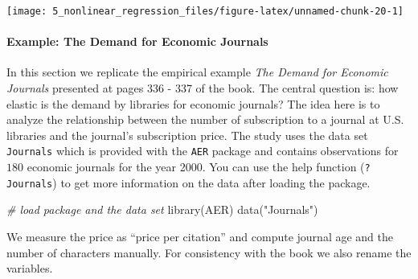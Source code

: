 \documentclass[
]{article}
\newenvironment{Shaded}{\begin{snugshade}}{\end{snugshade}}
\newcommand{\CommentTok}[1]{\textcolor[rgb]{0.56,0.35,0.01}{\textit{#1}}}
\newcommand{\DecValTok}[1]{\textcolor[rgb]{0.00,0.00,0.81}{#1}}
\newcommand{\FunctionTok}[1]{\textcolor[rgb]{0.00,0.00,0.00}{#1}}
\newcommand{\NormalTok}[1]{#1}
\newcommand{\OtherTok}[1]{\textcolor[rgb]{0.56,0.35,0.01}{#1}}
\newcommand{\SpecialCharTok}[1]{\textcolor[rgb]{0.00,0.00,0.00}{#1}}
\newcommand{\StringTok}[1]{\textcolor[rgb]{0.31,0.60,0.02}{#1}}
\begin{document}
\begin{center}\texttt{[image: 5\_nonlinear\_regression\_files/figure-latex/unnamed-chunk-20-1]} \end{center}

\hypertarget{example-the-demand-for-economic-journals}{%
\paragraph*{Example: The Demand for Economic
Journals}\label{example-the-demand-for-economic-journals}}

In this section we replicate the empirical example
\textit{The Demand for Economic Journals} presented at pages 336 - 337
of the book. The central question is: how elastic is the demand by
libraries for economic journals? The idea here is to analyze the
relationship between the number of subscription to a journal at U.S.
libraries and the journal's subscription price. The study uses the data
set \texttt{Journals} which is provided with the \texttt{AER} package
and contains observations for \(180\) economic journals for the year
2000. You can use the help function (\texttt{?Journals}) to get more
information on the data after loading the package.

\begin{Shaded}
\begin{Highlighting}[]
\CommentTok{\# load package and the data set}
\FunctionTok{library}\NormalTok{(AER)}
\FunctionTok{data}\NormalTok{(}\StringTok{"Journals"}\NormalTok{)}
\end{Highlighting}
\end{Shaded}

We measure the price as ``price per citation'' and compute journal age
and the number of characters manually. For consistency with the book we
also rename the variables.

\begin{Shaded}
\end{Shaded}
\end{document}
